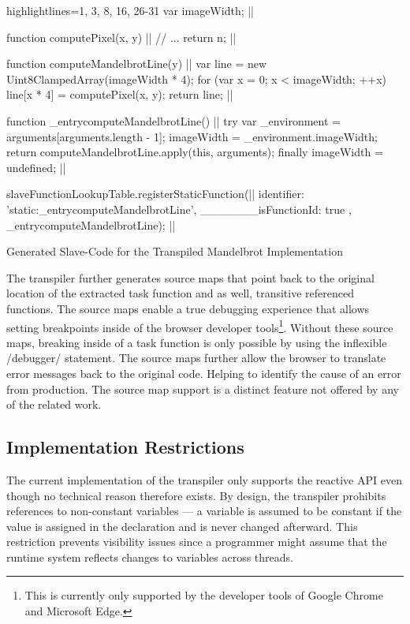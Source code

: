 \begin{listing}
\begin{javascriptcode*}{highlightlines={1, 3, 8, 16, 26-31}}
var imageWidth; |$\label{code:slave-image-width}$|

function computePixel(x, y) { |$\label{code:slave-compute-pixel-start}$|
	// ...
	return n;
}|$\label{code:slave-compute-pixel-end}$|

function computeMandelbrotLine(y) { |$\label{code:slave-task function-start}$|
	var line = new Uint8ClampedArray(imageWidth * 4);
	for (var x = 0; x < imageWidth; ++x) {
		line[x * 4] = computePixel(x, y);
	}
	return line;
}|$\label{code:slave-task function-end}$|
 
function _entrycomputeMandelbrotLine() { |$\label{code:slave-entry-function-start}$|
	try {
		var _environment = arguments[arguments.length - 1];
		imageWidth = _environment.imageWidth;
		return computeMandelbrotLine.apply(this, arguments);
	} finally {
		imageWidth = undefined;
	}
} |$\label{code:slave-entry-function-end}$|

slaveFunctionLookupTable.registerStaticFunction({|$\label{code:slave-register-function-start}$|
		identifier: 'static:_entrycomputeMandelbrotLine',
		_______isFunctionId: true
	}, _entrycomputeMandelbrotLine); |$\label{code:slave-register-function-end}$|
\end{javascriptcode*}
\caption{Generated Slave-Code for the Transpiled Mandelbrot Implementation}
\label{fig:transpiled-mandelbrot-slave}
\end{listing}

The transpiler further generates source maps that point back to the original location of the extracted task function and as well, transitive referenced functions. The source maps enable a true debugging experience that allows setting breakpoints inside of the browser developer tools\footnote{This is currently only supported by the developer tools of Google Chrome and Microsoft Edge.}. Without these source maps, breaking inside of a task function is only possible by using the inflexible \javascriptinline/debugger/ statement. The source maps further allow the browser to translate error messages back to the original code. Helping to identify the cause of an error from production. The source map support is a distinct feature not offered by any of the related work.

\subsection{Implementation Restrictions}
The current implementation of the transpiler only supports the reactive API even though no technical reason therefore exists. By design, the transpiler prohibits references to non-constant variables --- a variable is assumed to be constant if the value is assigned in the declaration and is never changed afterward. This restriction prevents visibility issues since a programmer might assume that the runtime system reflects changes to variables across threads. 


